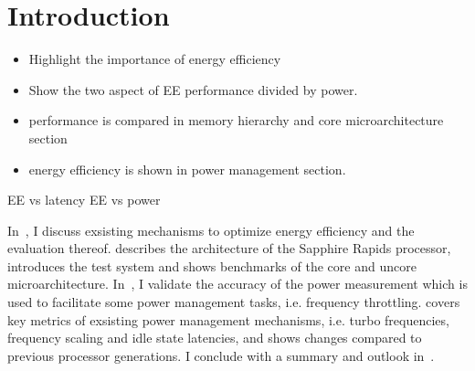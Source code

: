 \chapter{Introduction}
\label{sec:introduction}

\begin{itemize}
    \item Highlight the importance of energy efficiency
    \item Show the two aspect of EE performance divided by power.
    \item performance is compared in memory hierarchy and core microarchitecture section
    \item energy efficiency is shown in power management section.
\end{itemize}

EE vs latency
EE vs power

In~, I discuss exsisting mechanisms to optimize energy efficiency and the evaluation thereof.
 describes the architecture of the Sapphire Rapids processor, introduces the test system and shows benchmarks of the core and uncore microarchitecture.
In~, I validate the accuracy of the power measurement which is used to facilitate some power management tasks, i.e. frequency throttling.
 covers key metrics of exsisting power management mechanisms, i.e. turbo frequencies, frequency scaling and idle state latencies, and shows changes compared to previous processor generations.
I conclude with a summary and outlook in~.